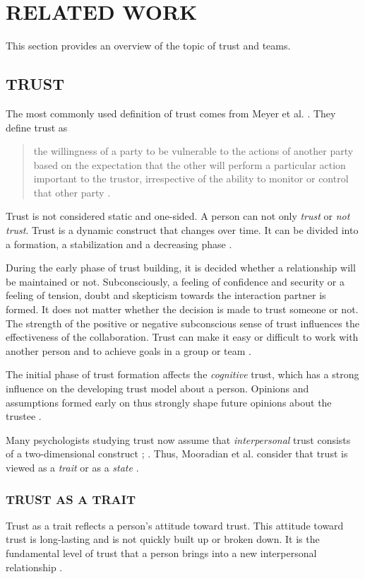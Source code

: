 \documentclass[sigchi]{acmart}
\begin{document}
\section{RELATED WORK}
This section provides an overview of the topic of trust and teams.
\subsection{TRUST}
The most commonly used definition of trust comes from Meyer et al. \citep[p. 712]{mayer1995integrative}. They define trust as
\begin{quote} \grqq{}the willingness of a party to be vulnerable to the actions of another party based on the expectation that the other will perform a particular action important to the trustor, irrespective of the ability to monitor or control that other party\grqq{} \citep[p. 712]{mayer1995integrative}.\end{quote}

Trust is not considered static and one-sided. A person can not only \textit{trust} or \textit{not trust}. Trust is a dynamic construct that changes over time. It can be divided into a formation, a stabilization and a decreasing phase \citep{rousseau1998not}.

During the early phase of trust building, it is decided whether a relationship will be maintained or not. Subconsciously, a feeling of confidence and security or a feeling of tension, doubt and skepticism towards the interaction partner is formed.
It does not matter whether the decision is made to trust someone or not. The strength of the positive or negative subconscious sense of trust influences the effectiveness of the collaboration. Trust can make it easy or difficult to work with another person and to achieve goals in a group or team \citep{bigley1998straining}.

The initial phase of trust formation affects the \textit{cognitive} trust, which has a strong influence on the developing trust model about a person.
Opinions and assumptions formed early on thus strongly shape future opinions about the trustee \citep{baldwin1992relational}.

Many psychologists studying trust now assume that \textit{interpersonal} trust consists of a two-dimensional construct \citep{johnson2005cognitive}; \citep{cook1980new}. Thus, Mooradian et al. consider that trust is viewed as a \textit{trait} or as a \textit{state} \citep{mooradian2006trusts}.

\subsubsection{TRUST AS A TRAIT}
Trust as a trait reflects a person's attitude toward trust. This attitude toward trust is long-lasting and is not quickly built up or broken down. It is the fundamental level of trust that a person brings into a new interpersonal relationship \citep{couch1996assessment}. 
\end{document}
